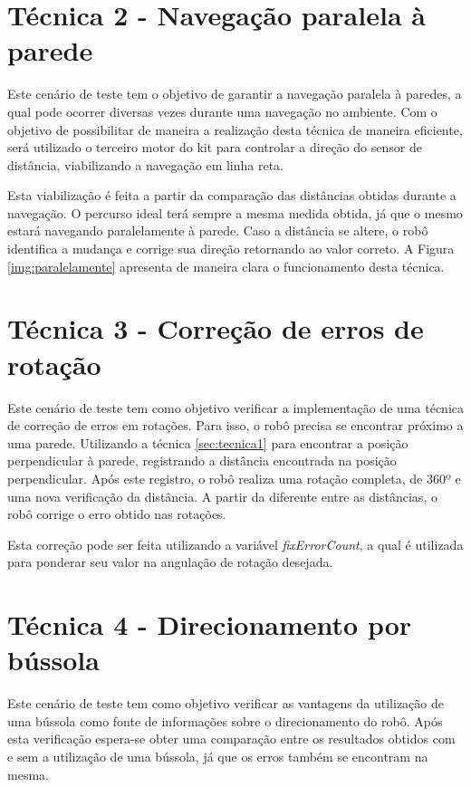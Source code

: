 
\section{Técnica 2 - Navegação paralela à parede} %
\label{sec:técnica_2_navegação_paralela_à_parede}
	
	Este cenário de teste tem o objetivo de garantir a navegação paralela à paredes, a qual pode ocorrer diversas vezes durante uma navegação no ambiente. Com o objetivo de possibilitar de maneira a realização desta técnica de maneira eficiente, será utilizado o terceiro motor do kit para controlar a direção do sensor de distância, viabilizando a navegação em linha reta.

	Esta viabilização é feita a partir da comparação das distâncias obtidas durante a navegação. O percurso ideal terá sempre a mesma medida obtida, já que o mesmo estará navegando paralelamente à parede. Caso a distância se altere, o robô identifica a mudança e corrige sua direção retornando ao valor correto. A Figura \ref{img:paralelamente} apresenta de maneira clara o funcionamento desta técnica.

\section{Técnica 3 - Correção de erros de rotação} %
\label{sec:técnica_3_correção_de_erros_de_rotação}
	
	Este cenário de teste tem como objetivo verificar a implementação de uma técnica de correção de erros em rotações. Para isso, o robô precisa se encontrar próximo a uma parede. Utilizando a técnica \ref{sec:tecnica1} para encontrar a posição perpendicular à parede, registrando a distância encontrada na posição perpendicular. Após este registro, o robô realiza uma rotação completa, de 360º e uma nova verificação da distância. A partir da diferente entre as distâncias, o robô corrige o erro obtido nas rotações. 

	Esta correção pode ser feita utilizando a variável \textit{fixErrorCount}, a qual é utilizada para ponderar seu valor na angulação de rotação desejada.

\section{Técnica 4 - Direcionamento por bússola} %
\label{sec:técnica_4_direcionamento_por_bússola}
	
	Este cenário de teste tem como objetivo verificar as vantagens da utilização de uma bússola como fonte de informações sobre o direcionamento do robô. Após esta verificação espera-se obter uma comparação entre os resultados obtidos com e sem a utilização de uma bússola, já que os erros também se encontram na mesma.
